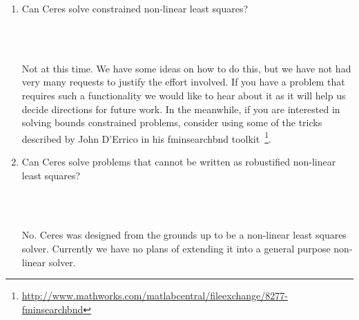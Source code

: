 \begin{enumerate}
\item \begin{Question}
Can Ceres solve constrained non-linear least squares?
\end{Question}\\ \\
\begin{Answer}
Not at this time. We have some ideas on how to do this, but we have not had very many requests to justify the effort involved. If you have a problem that requires such a functionality we would like to hear about it as it will help us decide directions for future work. In the meanwhile, if you are interested in solving bounds constrained problems, consider using some of the tricks described by John D'Errico in his fminsearchbnd toolkit~\footnote{\url{http://www.mathworks.com/matlabcentral/fileexchange/8277-fminsearchbnd}}.
\end{Answer}

\item \begin{Question}
Can Ceres solve problems that cannot be written as robustified non-linear least squares?
\end{Question}\\ \\
\begin{Answer}
No. Ceres was designed from the grounds up to be a non-linear least squares solver. Currently we have no plans of extending it into a general purpose non-linear solver.
\end{Answer}
\end{enumerate}
